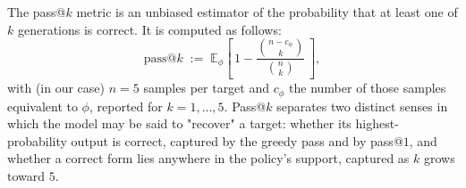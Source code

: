 \documentclass[titlepage,a4paper,11pt]{report}
\begin{document}
    The pass@$k$ metric is an unbiased estimator \citep{chen_evaluating_2021} of the probability that at least one of $k$ generations is correct. It is computed as follows:
    \begin{equation}\label{eq:pass_at_k}
        \mathrm{pass@}k \;:=\; \mathbb{E}_{\phi}\!\left[\, 1 - \frac{\binom{n - c_\phi}{k}}{\binom{n}{k}} \,\right],
    \end{equation}
    with (in our case) $n = 5$ samples per target and $c_\phi$ the number of those samples equivalent to $\phi$, reported for $k = 1, \dots, 5$. Pass@$k$ separates two distinct senses in which the model may be said to "recover" a target: whether its highest-probability output is correct, captured by the greedy pass and by pass@$1$, and whether a correct form lies anywhere in the policy's support, captured as $k$ grows toward $5$.

    
\end{document}
